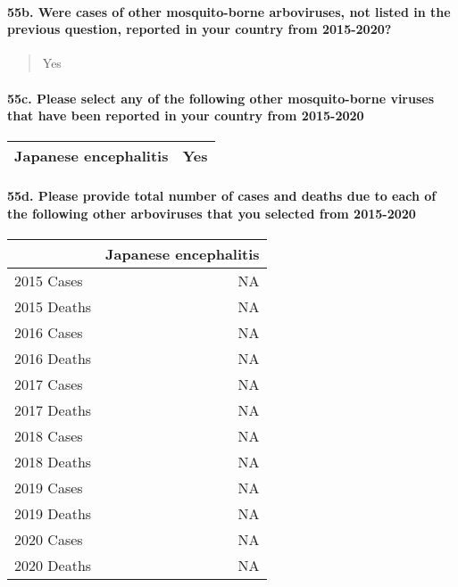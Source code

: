 \documentclass[
]{article}
\begin{document}
\hypertarget{b.-were-cases-of-other-mosquito-borne-arboviruses-not-listed-in-the-previous-question-reported-in-your-country-from-2015-2020}{%
\paragraph{55b. Were cases of other mosquito-borne arboviruses, not
listed in the previous question, reported in your country from
2015-2020?}\label{b.-were-cases-of-other-mosquito-borne-arboviruses-not-listed-in-the-previous-question-reported-in-your-country-from-2015-2020}}

\begin{quote}
Yes
\end{quote}

\hypertarget{c.-please-select-any-of-the-following-other-mosquito-borne-viruses-that-have-been-reported-in-your-country-from-2015-2020}{%
\paragraph{55c. Please select any of the following other mosquito-borne
viruses that have been reported in your country from
2015-2020}\label{c.-please-select-any-of-the-following-other-mosquito-borne-viruses-that-have-been-reported-in-your-country-from-2015-2020}}

\begin{longtable}[]{@{}ll@{}}
\toprule
\endhead
Japanese encephalitis & Yes \\
\bottomrule
\end{longtable}

\hypertarget{d.-please-provide-total-number-of-cases-and-deaths-due-to-each-of-the-following-other-arboviruses-that-you-selected-from-2015-2020}{%
\paragraph{55d. Please provide total number of cases and deaths due to
each of the following other arboviruses that you selected from
2015-2020}\label{d.-please-provide-total-number-of-cases-and-deaths-due-to-each-of-the-following-other-arboviruses-that-you-selected-from-2015-2020}}

\begin{longtable}[]{@{}lr@{}}
\toprule
& Japanese encephalitis \\
\midrule
\endhead
2015 Cases & NA \\
2015 Deaths & NA \\
2016 Cases & NA \\
2016 Deaths & NA \\
2017 Cases & NA \\
2017 Deaths & NA \\
2018 Cases & NA \\
2018 Deaths & NA \\
2019 Cases & NA \\
2019 Deaths & NA \\
2020 Cases & NA \\
2020 Deaths & NA \\
\bottomrule
\end{longtable}
\end{document}
